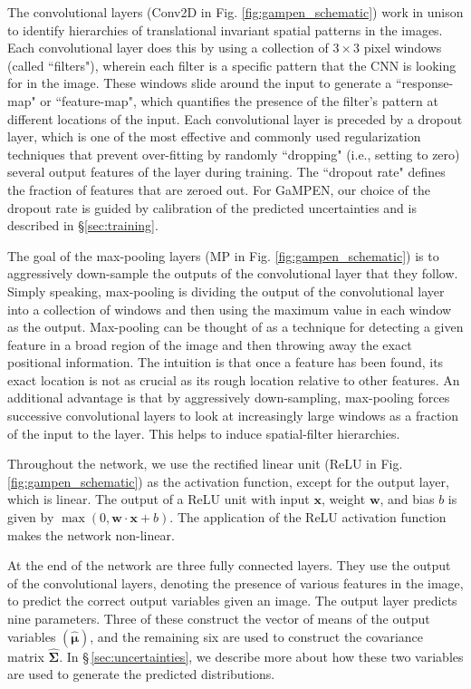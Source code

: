 \documentclass[twocolumn]{aastex63}
\newcommand\gampen{GaMPEN}
\begin{document}
\begin{CJK*}{UTF8}{gbsn}
The convolutional layers (Conv2D in Fig. \ref{fig:gampen_schematic}) work in unison to identify hierarchies of translational invariant spatial patterns in the images. Each convolutional layer does this by using a collection of $3\times3$ pixel windows (called ``filters"), wherein each filter is a specific pattern that the CNN is looking for in the image. These windows slide around the input to generate a ``response-map" or ``feature-map", which quantifies the presence of the filter's pattern at different locations of the input. Each convolutional layer is preceded by a dropout layer, which is one of the most effective and commonly used regularization techniques that prevent over-fitting by randomly ``dropping" (i.e., setting to zero) several output features of the layer during training. The ``dropout rate" defines the fraction of features that are zeroed out. For \gampen{}, our choice of the dropout rate is guided by calibration of the predicted uncertainties and is described in \S \ref{sec:training}.

The goal of the max-pooling layers (MP in Fig. \ref{fig:gampen_schematic}) is to aggressively down-sample the outputs of the convolutional layer that they follow. Simply speaking, max-pooling is dividing the output of the convolutional layer into a collection of windows and then using the maximum value in each window as the output. Max-pooling can be thought of as a technique for detecting a given feature in a broad region of the image and then throwing away the exact positional information. The intuition is that once a feature has been found, its exact location is not as crucial as its rough location relative to other features. An additional advantage is that by aggressively down-sampling, max-pooling forces successive convolutional layers to look at increasingly large windows as a fraction of the input to the layer. This helps to induce spatial-filter hierarchies. 

Throughout the network, we use the rectified linear unit (ReLU in Fig. \ref{fig:gampen_schematic}) as the activation function, except for the output layer, which is linear. The output of a ReLU unit with input $\mathbf{x}$, weight $\mathbf{w}$, and bias $b$ is given by $\max (0, \boldsymbol{w} \cdot \boldsymbol{x}+b)$. The application of the ReLU activation function makes the network non-linear. 

At the end of the network are three fully connected layers. They use the output of the convolutional layers, denoting the presence of various features in the image, to predict the correct output variables given an image. The output layer predicts nine parameters. Three of these construct the vector of means of the output variables $(\boldsymbol{\hat{\mu}})$, and the remaining six are used to construct the covariance matrix $\boldsymbol{\hat{\Sigma}}$. In \S\,\ref{sec:uncertainties}, we describe more about how these two variables are used to generate the predicted distributions.


\end{CJK*}
\end{document}
